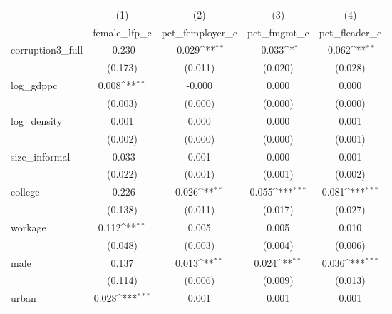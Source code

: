 {
\def\sym#1{\ifmmode^{#1}\else\(^{#1}\)\fi}
\begin{tabular}{l*{4}{c}}
\hline\hline
            &\multicolumn{1}{c}{(1)}&\multicolumn{1}{c}{(2)}&\multicolumn{1}{c}{(3)}&\multicolumn{1}{c}{(4)}\\
            &\multicolumn{1}{c}{female\_lfp\_c}&\multicolumn{1}{c}{pct\_femployer\_c}&\multicolumn{1}{c}{pct\_fmgmt\_c}&\multicolumn{1}{c}{pct\_fleader\_c}\\
\hline
corruption3\_full&      -0.230         &      -0.029\sym{**} &      -0.033\sym{*}  &      -0.062\sym{**} \\
            &     (0.173)         &     (0.011)         &     (0.020)         &     (0.028)         \\
[1em]
log\_gdppc   &       0.008\sym{**} &      -0.000         &       0.000         &       0.000         \\
            &     (0.003)         &     (0.000)         &     (0.000)         &     (0.000)         \\
[1em]
log\_density &       0.001         &       0.000         &       0.000         &       0.001         \\
            &     (0.002)         &     (0.000)         &     (0.000)         &     (0.001)         \\
[1em]
size\_informal&      -0.033         &       0.001         &       0.000         &       0.001         \\
            &     (0.022)         &     (0.001)         &     (0.001)         &     (0.002)         \\
[1em]
college     &      -0.226         &       0.026\sym{**} &       0.055\sym{***}&       0.081\sym{***}\\
            &     (0.138)         &     (0.011)         &     (0.017)         &     (0.027)         \\
[1em]
workage     &       0.112\sym{**} &       0.005         &       0.005         &       0.010         \\
            &     (0.048)         &     (0.003)         &     (0.004)         &     (0.006)         \\
[1em]
male        &       0.137         &       0.013\sym{**} &       0.024\sym{**} &       0.036\sym{***}\\
            &     (0.114)         &     (0.006)         &     (0.009)         &     (0.013)         \\
[1em]
urban       &       0.028\sym{***}&       0.001         &       0.001         &       0.001         \\

\end{tabular}}
